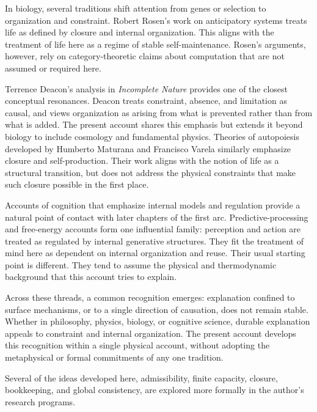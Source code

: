 \documentclass[11pt,twoside,openright]{book}
\begin{document}
In biology, several traditions shift attention from genes or selection to organization
and constraint. Robert Rosen's work on anticipatory systems treats life as defined by
closure and internal organization. This aligns with the treatment of life here as a
regime of stable self-maintenance. Rosen's arguments, however, rely on category-theoretic
claims about computation that are not assumed or required here.

Terrence Deacon's analysis in \emph{Incomplete Nature} provides one of the closest conceptual resonances. Deacon treats constraint, absence, and limitation as causal, and views organization as arising from what is prevented rather than from what is added. The present account shares this emphasis but extends it beyond biology to include cosmology and fundamental physics. Theories of autopoiesis developed by Humberto Maturana and Francisco Varela similarly emphasize closure and self-production. Their work aligns with the notion of life as a structural transition, but does not address the physical constraints that make such closure possible in the first place.

Accounts of cognition that emphasize internal models and regulation provide a natural
point of contact with later chapters of the first arc.
Predictive-processing and free-energy accounts form one influential family:
perception and action are treated as regulated by internal generative structures.
They fit the treatment of mind here as dependent on internal organization and reuse.
Their usual starting point is different.
They tend to assume the physical and thermodynamic background that this account tries
to explain.

Across these threads, a common recognition emerges: explanation confined to surface
mechanisms, or to a single direction of causation, does not remain stable. Whether in
philosophy, physics, biology, or cognitive science, durable explanation appeals to
constraint and internal organization. The present account develops this recognition
within a single physical account, without adopting the metaphysical or formal
commitments of any one tradition.


Several of the ideas developed here, admissibility, finite capacity, closure, bookkeeping, and global consistency, are explored more formally in the author's research programs.
\end{document}
